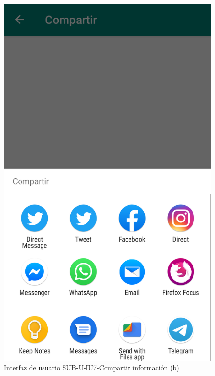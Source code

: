 \begin{figure}[H]
	\centering
	\includegraphics[scale=.28]{Capitulo4/software/submodulos/usuarios/images/sub-u-iu7_b}
	\caption{Interfaz de usuario SUB-U-IU7-Compartir información (b)}
	\label{fig:sub-u-iu7.b}
\end{figure}